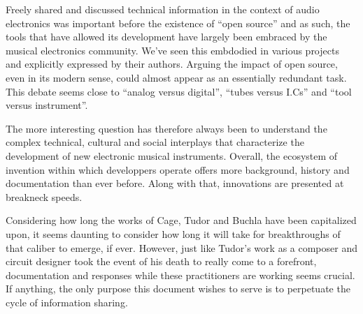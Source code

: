 Freely shared and discussed technical information in the context of audio electronics was important before the existence of ``open source'' and as such, the tools that have allowed its development have largely been embraced by the musical electronics community. We've seen this embdodied in various projects and explicitly expressed by their authors. Arguing the impact of open source, even in its modern sense, could almost appear as an essentially redundant task. This debate seems close to ``analog versus digital'', ``tubes versus I.Cs'' and ``tool versus instrument''. 

The more interesting question has therefore always been to understand the complex technical, cultural and social interplays that characterize the development of new electronic musical instruments. Overall, the ecosystem of invention within which developpers operate offers more background, history and documentation than ever before. Along with that, innovations are presented at breakneck speeds. 

Considering how long the works of Cage, Tudor and Buchla have been capitalized upon, it seems daunting to consider how long it will take for breakthroughs of that caliber to emerge, if ever. However, just like Tudor's work as a composer and circuit designer took the event of his death to really come to a forefront, documentation and responses while these practitioners are working seems crucial. If anything, the only purpose this document wishes to serve is to perpetuate the cycle of information sharing. 